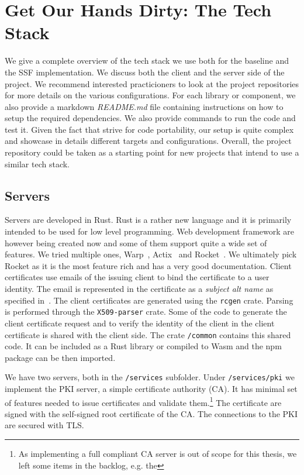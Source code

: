 \section{Get Our Hands Dirty: The Tech Stack}

We give a complete overview of the tech stack we use both
for the baseline and the SSF implementation.
We discuss both the client and the server side of the project.
We recommend interested practicioners to look at the
project repositories for more details on the various
configurations.
For each library or component, we also provide a markdown
\textit{README.md} file containing instructions on how to
setup the required dependencies. We also provide commands
to run the code and test it.
Given the fact that strive for code portability, our setup
is quite complex and showcase in details
different targets and configurations.
Overall, the project repository
could be taken as a starting point for new projects that
intend to use a similar tech stack.

\subsection{Servers}

Servers are developed in Rust. Rust is a rather new language
and it is primarily intended to be used for low level
programming. Web development framework are however
being created now and some of them support quite a wide
set of features. We tried multiple ones, Warp~\cite{Warp}, 
Actix~\cite{Actix} and Rocket~\cite{Rocket}.
We ultimately pick Rocket as it is the most feature rich
and has a very good documentation. 
Client certificates use emails of the issuing client to bind the certificate to
a user identity.
The email is represented in the certificate as a \textit{subject alt name} as specified in~\cite{rfc5280}.
The client certificates are generated using the
\texttt{rcgen} crate. Parsing is performed through
the \texttt{X509-parser} crate. Some of the code
to generate the client certificate request and to
verify the identity of the client in the client certificate
is shared with the client side. The crate
\texttt{/common} contains this shared code.
It can be included as a Rust library or
compiled to Wasm and the npm package can be then
imported.


We have two servers, both in the \texttt{/services} subfolder.
Under \texttt{/services/pki} we implement the PKI server, a simple certificate authority (CA).
It has minimal set of features needed to issue certificates
and validate them.\footnote{As implementing a full compliant CA server is out of scope for this thesis, we left some items in the backlog, e.g. the } The certificate are signed with the
self-signed root certificate of the CA.
The connections to the PKI are secured with TLS.


